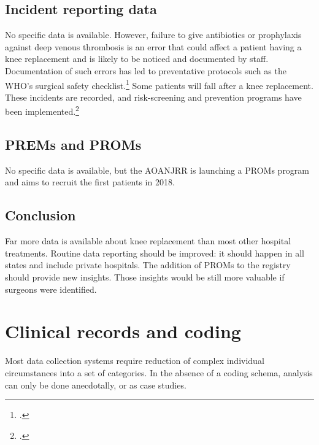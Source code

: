 \documentclass[FrontPage]{grattan}
\begin{document}
\section{Incident reporting data}
No specific data is available. However, failure to give antibiotics or prophylaxis against deep venous thrombosis is an error that could affect a patient having a knee replacement and is likely to be noticed and documented by staff. Documentation of such errors has led to preventative protocols such as the WHO’s surgical safety checklist.\footcite{RN101}
Some patients will fall after a knee replacement. These incidents are recorded, and risk-screening and prevention programs have been implemented.\footcite{miake2013inpatient}

\section{PREMs and PROMs}
No specific data is available, but the AOANJRR is launching a PROMs program and aims to recruit the first patients in 2018.

\section{Conclusion}
Far more data is available about knee replacement than most other hospital treatments. Routine data reporting should be improved: it should happen in all states and include private hospitals. The addition of PROMs to the registry should provide new insights. Those insights would be still more valuable if surgeons were identified.

\chapter{Clinical records and coding}\label{chap:coding}

Most data collection systems require reduction of complex individual circumstances into a set of categories. In the absence of a coding schema, analysis can only be done anecdotally, or as case studies.
\end{document}
